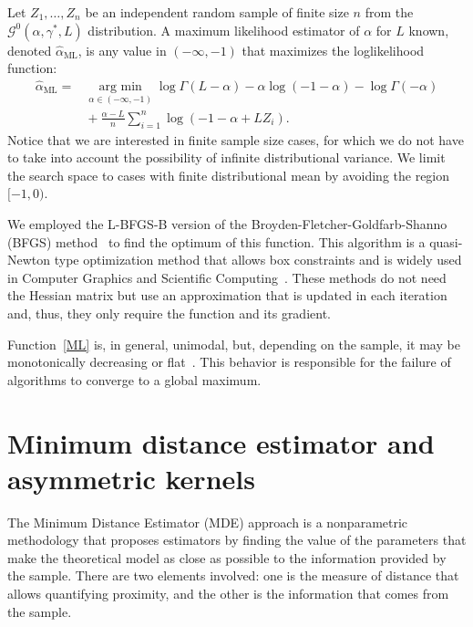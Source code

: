 \documentclass[twocolumn]{svjour3}
\newcommand{\argmin}{\operatorname*{\text{arg min }}}
\begin{document}
	Let $Z_1,\dots, Z_n$ be an independent random sample of finite size $n$ from the $\mathcal G^0(\alpha,\gamma^*,L)$ distribution.
	A maximum likelihood estimator of $\alpha$ for $L$ known, denoted $\widehat\alpha_{\text{{ML}}}$, is any value in $(-\infty,-1)$ that maximizes the loglikelihood function:
	\begin{align}
		\hat{\alpha}_{\text{{ML}}}=&\argmin_{\alpha \in (-\infty,-1)}\log \Gamma(L-\alpha)-
		\alpha\log(-1-\alpha)-\log\Gamma(-\alpha) \nonumber \\
		&\mbox{}+\frac{\alpha-L}{n} \sum_{i=1}^n\log(-1-\alpha+L Z_i).
		\label{ML}
	\end{align}
	Notice that we are interested in finite sample size cases, for which we do not have to take into account the possibility of infinite distributional variance.
	We limit the search space to cases with finite distributional mean by avoiding the region $[-1,0)$.
	
	We employed the L-BFGS-B version of the Broyden-Fletcher-Goldfarb-Shanno (BFGS) method~\cite{Luenberger2008} to find the optimum of this function. This algorithm is a quasi-Newton type optimization method that allows box constraints and is widely used in Computer Graphics and Scientific Computing~\cite{FEI2014}. 
	These methods do not need the Hessian matrix but use an approximation that is updated in each iteration and, thus, they only require the function and its gradient.
	
	Function~\eqref{ML} is, in general, unimodal, but, depending on the sample, it may be monotonically decreasing or flat~\cite{FreryCribariSouza:JASP:04}. 
	This behavior is responsible for the failure of algorithms to converge to a global maximum.
	
	
	\section{Minimum distance estimator and asymmetric kernels}
	\label{distancekernel}
	
	The Minimum Distance Estimator (MDE) approach is a nonparametric methodology that proposes estimators by finding the value of the parameters that make the theoretical model as close as possible to the information provided by the sample. 
	There are two elements involved: one is the measure of distance that allows quantifying proximity, and the other is the information that comes from the sample.
	
\end{document}
